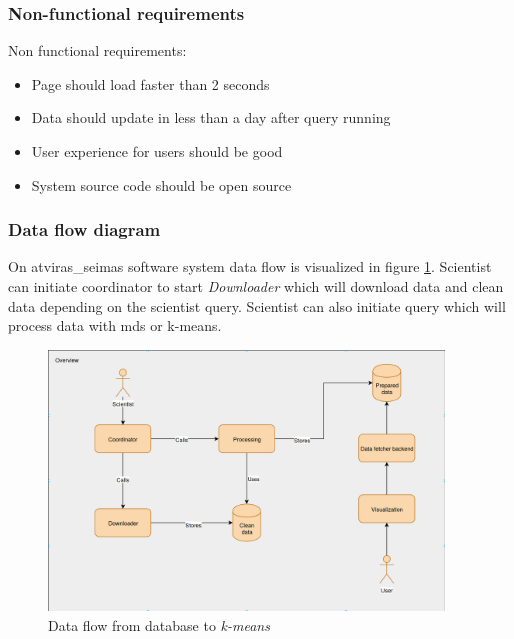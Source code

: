 \documentclass[a4paper,12pt]{article}
\begin{document}
   	\hfill
   	
   	\subsubsection{Non-functional requirements}
   	
   	Non functional requirements:
   	\begin{itemize}
   		\item Page should load faster than 2 seconds
  		\item Data should update in less than a day after query running
  		\item User experience for users should be good
  		\item System source code should be open source
   	\end{itemize}
   	
   	\hfill
   	
  	\subsubsection{Data flow diagram}
		On \gls{atviras_seimas} software system data flow is visualized in figure \ref{fig:data_flow_pipeline}. Scientist can initiate coordinator to start \textit{Downloader} which will download data and clean data depending on the scientist query. Scientist can also initiate query which will process data with \acrshort{mds} or \gls{k-means}.

      	\begin{figure}[H]	
	    	\centering
	    	\includegraphics[width=10.5cm]{images/data_flow_overview.png}
	    	\caption{Data flow from database to \textit{k-means}}
	    	\label{fig:data_flow_pipeline}
  		\end{figure}
		
		    \vspace{1cm}
		    
\end{document}
